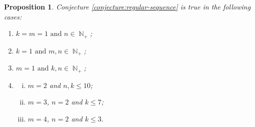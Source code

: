 \documentclass[a4paper,12pt]{amsart}
\theoremstyle{plain}
\newtheorem{proposition}[theorem]{Proposition}
\theoremstyle{definition}
\theoremstyle{remark}
\DeclareMathOperator{\NN}{\mathbb{N}}
\begin{document}
\begin{proposition}\label{proposition:regular-sequence}
    Conjecture \ref{conjecture:regular-sequence} is true in the following cases:
    \begin{enumerate}
        \item $k = m  = 1 \text{ and } n \in \NN_+$;
        \item $k = 1 \text{ and } m, n \in \NN_+$;
        \item $m = 1 \text{ and } k, n \in \NN_+$;
        \item \begin{enumerate}[i.]
            \item $m = 2$ and $n, k \leq 10$;
            \item $m = 3$, $n = 2$ and $k \leq 7$;
            \item $m = 4$, $n = 2$ and $k \leq 3$.
        \end{enumerate}
    \end{enumerate}
\end{proposition}
\end{document}
